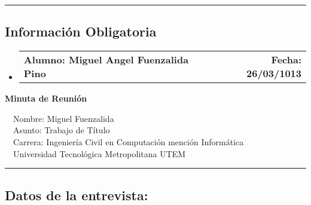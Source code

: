 \documentclass[10pt,letterpaper]{article}
\makeatletter
\newcommand{\headerrow}[2]
{\begin{tabular*}{\linewidth}{l@{\extracolsep{\fill}}r}
	#1 &
	#2 \\
\end{tabular*}}
\makeatother
\begin{document}
\hrule
\vspace{-0.4em}
\subsection*{Información Obligatoria}

\begin{itemize}
	\parskip=0.1em

	\item 
	\headerrow
		{\textbf{Alumno: Miguel Angel Fuenzalida Pino}}
		{\textbf{Fecha: 26/03/1013}}

\end{itemize}
\newpage
\begin{center}
{\LARGE \textbf{Minuta de Reunión}}

\ \ \textbullet Nombre: Miguel Fuenzalida
\\
\ \ \textbullet Asunto: Trabajo de Título
\\
\ \ \textbullet Carrera: Ingeniería Civil en Computación mención Informática
\\
\ \ \textbullet Universidad Tecnológica Metropolitana UTEM
\end{center}

\hrule
\vspace{-0.4em}
\subsection*{Datos de la entrevista:}
\end{document}
